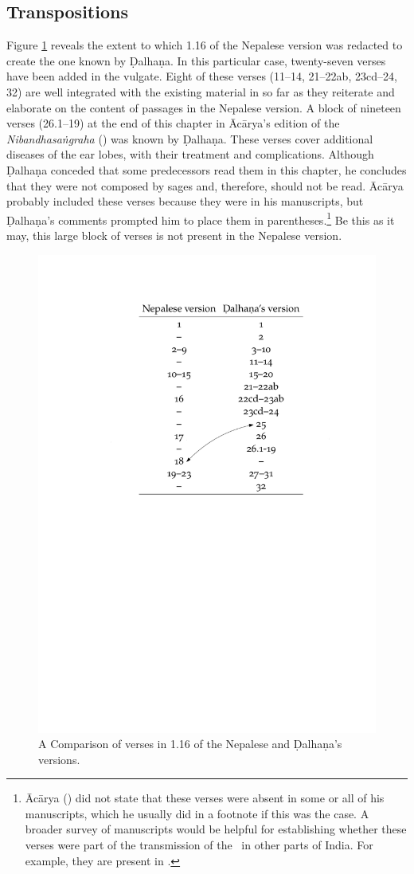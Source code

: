 \subsection{Transpositions}


Figure \ref{fig:chapters} reveals the extent to which 1.16 of the Nepalese version
was redacted to create the one known by Ḍalhaṇa. In this particular case,
twenty-seven verses have been added in the vulgate.  Eight of these verses
(11--14, 21--22ab, 23cd--24, 32) are well integrated with the existing material in
so far as they reiterate and elaborate on the content of passages in the Nepalese
version. A block of nineteen verses (26.1--19) at the end of this chapter in
Ācārya's edition of the \emph{Nibandhasaṅgraha} (\cite[80]{vulgate}) was known by
Ḍalhaṇa. These verses cover additional diseases of the ear lobes, with their
treatment and complications. Although Ḍalhaṇa conceded that some predecessors read
them in this chapter, he concludes that they were not composed by sages and,
therefore, should not be read. Ācārya probably included these verses because they
were in his manuscripts, but Ḍalhaṇa's comments prompted him to place them in
parentheses.\footnote{Ācārya (\cite[80]{vulgate}) did not state that these verses
    were absent in some or all of his manuscripts, which he usually did in a footnote
    if this was the case. A broader survey of manuscripts would be helpful for
    establishing whether these verses were part of the transmission of the \SS\ in
    other parts of India. For example, they are present in .}  Be this as it may, this large block of verses is not present in the
    Nepalese version.
\begin{figure}[t]
\centering
\includegraphics[draft=false,width=.75\textwidth]{media/table-of-versions.pdf}
\caption{A Comparison of verses in 1.16 of the Nepalese and Ḍalhaṇa's versions.}
\label{fig:chapters}
\end{figure}


